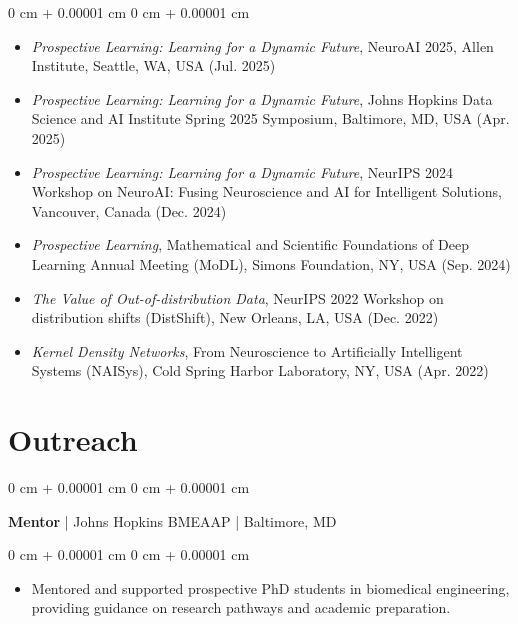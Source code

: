 \documentclass[10pt, letterpaper]{article}
\newenvironment{highlights}{
    \begin{itemize}[
        topsep=0.10 cm,
        parsep=0.10 cm,
        partopsep=0pt,
        itemsep=0pt,
        leftmargin=0 cm + 10pt
    ]
}{
    \end{itemize}
} %
\newenvironment{onecolentry}{
    \begin{adjustwidth}{
        0 cm + 0.00001 cm
    }{
        0 cm + 0.00001 cm
    }
}{
    \end{adjustwidth}
} %
\newenvironment{twocolentry}[2][]{
    \onecolentry
    \def\secondColumn{#2}
    \setcolumnwidth{\fill, 4.5 cm}
    \begin{paracol}{2}
}{
    \switchcolumn \raggedleft \secondColumn
    \end{paracol}
    \endonecolentry
} %
\begin{document}
    \begin{onecolentry}
        \begin{highlights}
            \item \textit{Prospective Learning: Learning for a Dynamic Future}, NeuroAI 2025, Allen Institute, Seattle, WA, USA (Jul. 2025)
            \item \textit{Prospective Learning: Learning for a Dynamic Future}, Johns Hopkins Data Science and AI Institute Spring 2025 Symposium, Baltimore, MD, USA (Apr. 2025)
            \item \textit{Prospective Learning: Learning for a Dynamic Future}, NeurIPS 2024 Workshop on NeuroAI: Fusing Neuroscience and AI for Intelligent Solutions, Vancouver, Canada (Dec. 2024)
            \item \textit{Prospective Learning}, Mathematical and Scientific Foundations of Deep Learning Annual Meeting (MoDL), Simons Foundation, NY, USA (Sep. 2024)
            \item \textit{The Value of Out-of-distribution Data}, NeurIPS 2022 Workshop on distribution shifts (DistShift), New Orleans, LA, USA (Dec. 2022)
            \item \textit{Kernel Density Networks}, From Neuroscience to Artificially Intelligent Systems (NAISys), Cold Spring Harbor Laboratory, NY, USA (Apr. 2022)
        \end{highlights}
    \end{onecolentry}


    \section{Outreach}

    \vspace{0.2 cm}

    \begin{twocolentry}{2024}
    \textbf{Mentor} | Johns Hopkins BMEAAP | Baltimore, MD
    \end{twocolentry}
    \vspace{0.10 cm}
    \begin{onecolentry}
        \begin{highlights}
            \item Mentored and supported prospective PhD students in biomedical engineering, providing guidance on research pathways and academic preparation.
        \end{highlights}
    \end{onecolentry}
\end{document}
